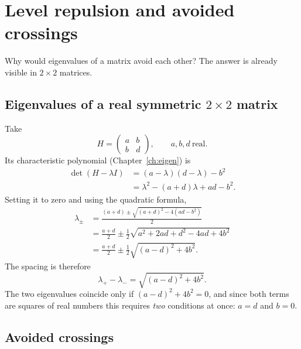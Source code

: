 \section{Level repulsion and avoided crossings}\label{sec:level-statistics-repulsion}

Why would eigenvalues of a matrix avoid each other? The answer is already visible in $2\times2$ matrices.

\subsection{Eigenvalues of a real symmetric $2\times2$ matrix}

Take
\begin{equation}
H=\begin{pmatrix} a & b\\ b & d\end{pmatrix},\qquad a,b,d\ \text{real}.
\end{equation}
Its characteristic polynomial (Chapter~\ref{ch:eigen}) is
\begin{align}
\det(H-\lambda I)&=(a-\lambda)(d-\lambda)-b^2\nonumber\\
&=\lambda^2-(a+d)\lambda+ad-b^2 .
\end{align}
Setting it to zero and using the quadratic formula,
\begin{align}
\lambda_\pm&=\frac{(a+d)\pm\sqrt{(a+d)^2-4(ad-b^2)}}{2}\nonumber\\
&=\frac{a+d}{2}\pm\frac12\sqrt{a^2+2ad+d^2-4ad+4b^2}\nonumber\\
&=\frac{a+d}{2}\pm\frac12\sqrt{(a-d)^2+4b^2}.
\label{eq:level-statistics-2x2eig}
\end{align}
The spacing is therefore
\begin{equation}
\lambda_+-\lambda_-=\sqrt{(a-d)^2+4b^2}.
\label{eq:level-statistics-2x2gap}
\end{equation}
The two eigenvalues coincide only if $(a-d)^2+4b^2=0$, and since both terms are squares of real numbers this requires \emph{two} conditions at once: $a=d$ and $b=0$.

\subsection{Avoided crossings}

